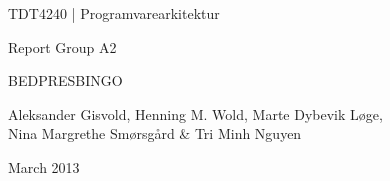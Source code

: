 \begin{titlepage}
\begin{center}
\vspace*{1in}
{\LARGE TDT4240 | Programvarearkitektur}
\par
\vspace{1in}
{\LARGE Report Group A2}
\par
\vspace{1in}
{\LARGE BEDPRESBINGO} %
\par
\vfill
\par
\vspace{0.5in}
Aleksander Gisvold, Henning M. Wold, Marte Dybevik Løge,\\
Nina Margrethe Smørsgård \& Tri Minh Nguyen
\par
March 2013 %
\end{center}
\end{titlepage}
